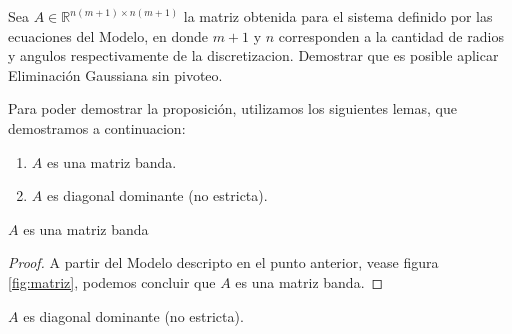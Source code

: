 \begin{proposition}
    Sea $A \in \mathbb{R}^{n(m+1) \times n(m+1)}$ la matriz obtenida para el sistema definido por las ecuaciones del Modelo, en donde $m+1$ y $n$ corresponden a la cantidad de radios y angulos respectivamente de la discretizacion. Demostrar que es posible aplicar Eliminación Gaussiana sin pivoteo.
\end{proposition}

Para poder demostrar la proposición, utilizamos los siguientes lemas, que demostramos a continuacion:

  \begin{enumerate}[label=(\subscript{L}{\arabic*})]
    \item $A$ es una matriz banda.
    \item $A$ es diagonal dominante (no estricta).

  \end{enumerate}

  \begin{lemma}
    $A$ es una matriz banda
  \end{lemma}

  \begin{proof}
    A partir del Modelo descripto en el punto anterior, vease figura \ref{fig:matriz}, podemos concluir que $A$ es una matriz banda.
  \end{proof}

  \begin{lemma}
    $A$ es diagonal dominante (no estricta).
  \end{lemma}


